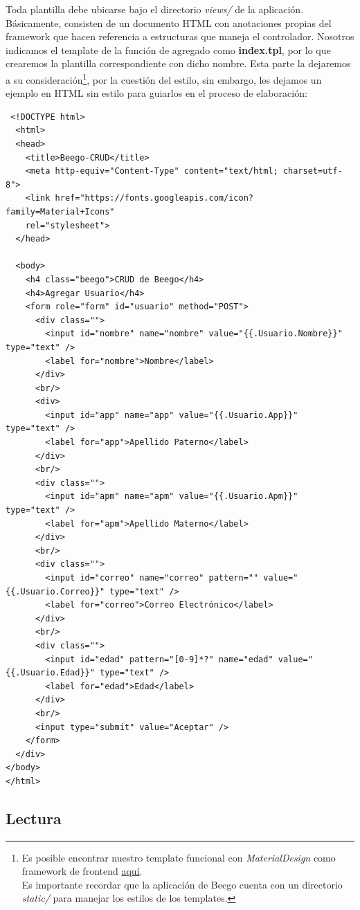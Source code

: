 \documentclass[12pt]{article}
\begin{document}
Toda plantilla debe ubicarse bajo el directorio \textit{views/} de la aplicación.
Básicamente, consisten de un documento HTML con anotaciones propias del framework
que hacen referencia a estructuras que maneja el controlador.
Nosotros indicamos el template de la función de agregado como \textbf{index.tpl},
por lo que crearemos la plantilla correspondiente con dicho nombre.
Esta parte la dejaremos a su consideración\footnote{Es posible encontrar nuestro
  template funcional con \textit{MaterialDesign} como framework de frontend
  \href{https://github.com/Kihui/Beego-CRUD/blob/master/views/index.tpl}{aquí}.\\
  Es importante recordar que la aplicación de Beego cuenta con un directorio \textit{static/}
para manejar los estilos de los templates.},
por la cuestión del estilo,
sin embargo, les dejamos un ejemplo en HTML sin estilo para guiarlos en el
proceso de elaboración:
\begin{verbatim}
 <!DOCTYPE html>
  <html>
  <head>
    <title>Beego-CRUD</title>
    <meta http-equiv="Content-Type" content="text/html; charset=utf-8">
    <link href="https://fonts.googleapis.com/icon?family=Material+Icons"
    rel="stylesheet">
  </head>

  <body>
    <h4 class="beego">CRUD de Beego</h4>
    <h4>Agregar Usuario</h4>
    <form role="form" id="usuario" method="POST">
      <div class="">
        <input id="nombre" name="nombre" value="{{.Usuario.Nombre}}" type="text" />
        <label for="nombre">Nombre</label>
      </div>
      <br/>
      <div>
        <input id="app" name="app" value="{{.Usuario.App}}" type="text" />
        <label for="app">Apellido Paterno</label>
      </div>
      <br/>
      <div class="">
        <input id="apm" name="apm" value="{{.Usuario.Apm}}" type="text" />
        <label for="apm">Apellido Materno</label>
      </div>
      <br/>
      <div class="">
        <input id="correo" name="correo" pattern="" value="{{.Usuario.Correo}}" type="text" />
        <label for="correo">Correo Electrónico</label>
      </div>
      <br/>
      <div class="">
        <input id="edad" pattern="[0-9]*?" name="edad" value="{{.Usuario.Edad}}" type="text" />
        <label for="edad">Edad</label>
      </div>
      <br/>
      <input type="submit" value="Aceptar" />
    </form>
  </div>
</body>
</html>

\end{verbatim}
\subsection{Lectura}
\end{document}
